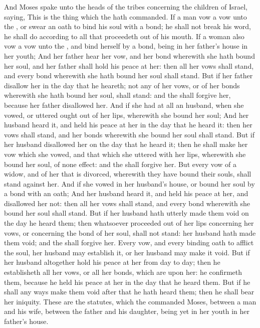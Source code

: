 \begin{biblechapter} %
 And Moses spake unto the heads of the tribes concerning the children of Israel, saying, This is the thing which the \LORD hath commanded.
\verse If a man vow a vow unto the \LORD, or swear an oath to bind his soul with a bond; he shall not break his word, he shall do according to all that proceedeth out of his mouth.
\verse If a woman also vow a vow unto the \LORD, and bind herself by a bond, being in her father's house in her youth;
\verse And her father hear her vow, and her bond wherewith she hath bound her soul, and her father shall hold his peace at her: then all her vows shall stand, and every bond wherewith she hath bound her soul shall stand.
\verse But if her father disallow her in the day that he heareth; not any of her vows, or of her bonds wherewith she hath bound her soul, shall stand: and the \LORD shall forgive her, because her father disallowed her.
\verse And if she had at all an husband, when she vowed, or uttered ought out of her lips, wherewith she bound her soul;
\verse And her husband heard it, and held his peace at her in the day that he heard it: then her vows shall stand, and her bonds wherewith she bound her soul shall stand.
\verse But if her husband disallowed her on the day that he heard it; then he shall make her vow which she vowed, and that which she uttered with her lips, wherewith she bound her soul, of none effect: and the \LORD shall forgive her.
\verse But every vow of a widow, and of her that is divorced, wherewith they have bound their souls, shall stand against her.
\verse And if she vowed in her husband's house, or bound her soul by a bond with an oath;
\verse And her husband heard it, and held his peace at her, and disallowed her not: then all her vows shall stand, and every bond wherewith she bound her soul shall stand.
\verse But if her husband hath utterly made them void on the day he heard them; then whatsoever proceeded out of her lips concerning her vows, or concerning the bond of her soul, shall not stand: her husband hath made them void; and the \LORD shall forgive her.
\verse Every vow, and every binding oath to afflict the soul, her husband may establish it, or her husband may make it void.
\verse But if her husband altogether hold his peace at her from day to day; then he establisheth all her vows, or all her bonds, which are upon her: he confirmeth them, because he held his peace at her in the day that he heard them.
\verse But if he shall any ways make them void after that he hath heard them; then he shall bear her iniquity.
\verse These are the statutes, which the \LORD commanded Moses, between a man and his wife, between the father and his daughter, being yet in her youth in her father's house.
\end{biblechapter}

